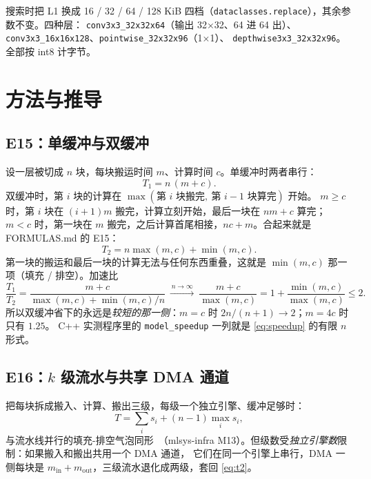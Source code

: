 \documentclass[11pt,a4paper]{ctexart}
\begin{document}
搜索时把 L1 换成 16 / 32 / 64 / 128 KiB 四档（\texttt{dataclasses.replace}），其余参数不变。四种层：
\texttt{conv3x3\_32x32x64}（输出 32×32、64 进 64 出）、\texttt{conv3x3\_16x16x128}、\texttt{pointwise\_32x32x96}（1×1）、
\texttt{depthwise3x3\_32x32x96}。全部按 int8 计字节。

\section{方法与推导}\label{sec:method}

\subsection{E15：单缓冲与双缓冲}

设一层被切成 $n$ 块，每块搬运时间 $m$、计算时间 $c$。单缓冲时两者串行：
\begin{equation}
T_1 = n\,(m + c). \label{eq:t1}
\end{equation}
双缓冲时，第 $i$ 块的计算在 $\max(\text{第 } i \text{ 块搬完},\ \text{第 } i-1 \text{ 块算完})$ 开始。
$m\ge c$ 时，第 $i$ 块在 $(i+1)m$ 搬完，计算立刻开始，最后一块在 $nm + c$ 算完；
$m<c$ 时，第一块在 $m$ 搬完，之后计算首尾相接，$nc + m$。合起来就是 FORMULAS.md 的 E15：
\begin{equation}
T_2 = n\max(m, c) + \min(m, c). \label{eq:t2}
\end{equation}
第一块的搬运和最后一块的计算无法与任何东西重叠，这就是 $\min(m,c)$ 那一项（填充 / 排空）。加速比
\begin{equation}
\frac{T_1}{T_2} = \frac{m + c}{\max(m,c) + \min(m,c)/n}\ \xrightarrow{\,n\to\infty\,}\ \frac{m+c}{\max(m,c)} = 1 + \frac{\min(m,c)}{\max(m,c)} \le 2. \label{eq:speedup}
\end{equation}
所以双缓冲省下的永远是\emph{较短的那一侧}：$m=c$ 时 $2n/(n+1)\to2$；$m=4c$ 时只有 $1.25$。
C++ 实测程序里的 \texttt{model\_speedup} 一列就是 \cref{eq:speedup} 的有限 $n$ 形式。

\subsection{E16：$k$ 级流水与共享 DMA 通道}

把每块拆成搬入、计算、搬出三级，每级一个独立引擎、缓冲足够时：
\begin{equation}
T = \sum_i s_i + (n-1)\max_i s_i, \label{eq:kstage}
\end{equation}
与流水线并行的填充-排空气泡同形~\cite{gpipe}（mlsys-infra M13）。但级数受\emph{独立引擎数}限制：如果搬入和搬出共用一个 DMA 通道，
它们在同一个引擎上串行，DMA 一侧每块是 $m_{\text{in}} + m_{\text{out}}$，三级流水退化成两级，套回 \cref{eq:t2}。
\end{document}
